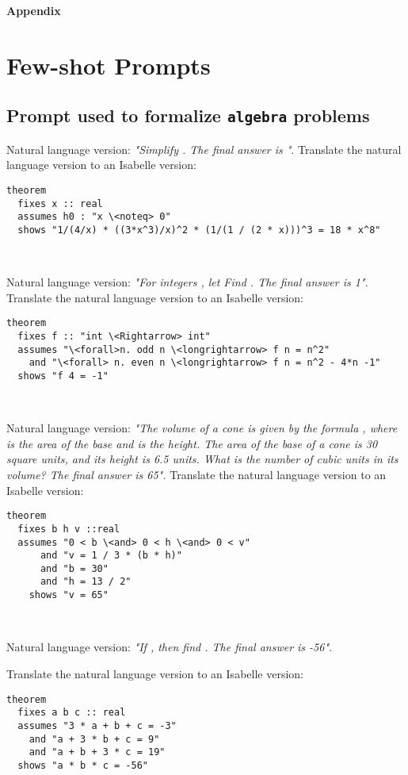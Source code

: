 \documentclass{article}
\begin{document}


\appendix
\newpage
\textbf{\huge Appendix}

\section{Few-shot Prompts}



\subsection{Prompt used to formalize \texttt{algebra} problems}
\label{appendix:prompt_quan_study_algebra}
 
 \begin{boxB}
Natural language version: \emph{"Simplify . The final answer is "}. Translate the natural language version to an Isabelle version:

\begin{lstlisting}
theorem
  fixes x :: real
  assumes h0 : "x \<noteq> 0"
  shows "1/(4/x) * ((3*x^3)/x)^2 * (1/(1 / (2 * x)))^3 = 18 * x^8"
\end{lstlisting}

\

Natural language version: \emph{"For integers , let Find . The final answer is 1".}
Translate the natural language version to an Isabelle version:
\begin{lstlisting}
theorem
  fixes f :: "int \<Rightarrow> int"
  assumes "\<forall>n. odd n \<longrightarrow> f n = n^2"
    and "\<forall> n. even n \<longrightarrow> f n = n^2 - 4*n -1"
  shows "f 4 = -1"
\end{lstlisting}

\

Natural language version: \emph{"The volume of a cone is given by the formula , where  is the area of the base and  is the height. The area of
the base of a cone is 30 square units, and its height is 6.5 units. What is the number of cubic units in its volume? The final answer is 65".}
Translate the natural language version to an Isabelle version:
\begin{lstlisting}
theorem
  fixes b h v ::real
  assumes "0 < b \<and> 0 < h \<and> 0 < v"
      and "v = 1 / 3 * (b * h)"
      and "b = 30"
      and "h = 13 / 2"
    shows "v = 65"
\end{lstlisting}

\

Natural language version: \emph{"If , then find . The final answer is -56".}

Translate the natural language version to an Isabelle version:
\begin{lstlisting}
theorem
  fixes a b c :: real
  assumes "3 * a + b + c = -3"
    and "a + 3 * b + c = 9"
    and "a + b + 3 * c = 19"
  shows "a * b * c = -56"
\end{lstlisting}
\end{boxB}
\end{document}
